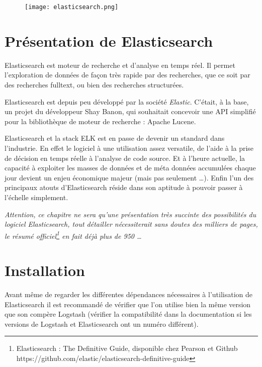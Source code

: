 
\begin{figure}[H]
\center
\texttt{[image: elasticsearch.png]}
\label{fig:elasticsearchlogo.png}
\end{figure}
\section{Présentation de Elasticsearch}
Elasticsearch est moteur de recherche et d'analyse en temps réel. Il permet l'exploration
de données de façon très rapide par des recherches, que ce soit par des recherches
\gls{fulltext}, ou bien des recherches structurées.

Elasticsearch est depuis peu développé par la société \emph{Elastic}. C'était, à 
la base, un projet du développeur Shay Banon, qui souhaitait concevoir une API simplifié
pour la bibliothèque de moteur de recherche : Apache Lucene.

Elasticsearch et la stack ELK est en passe de devenir un standard dans l'industrie.
En effet le logiciel à une utilisation assez versatile, de l'aide à la prise de 
décision en temps réelle à l'analyse de code source. Et à l'heure actuelle, la capacité 
à exploiter les masses de données et de méta données accumulées chaque jour devient 
un enjeu économique majeur (mais pas seulement \ldots). Enfin l'un des principaux 
atouts d'Elasticsearch réside dans son aptitude à pouvoir passer à l'échelle simplement.

\footnotesize{\emph{Attention, ce chapitre ne sera qu'une présentation très succinte des possibilités 
du logiciel Elasticsearch, tout détailler nécessiterait \emph{sans doutes} des milliers
de pages, le résumé officiel\footnote{Elasticsearch : The Definitive Guide, disponible 
chez Pearson et Github https://github.com/elastic/elasticsearch-definitive-guide}
en fait déjà \emph{plus de 950} \ldots}}

\section{Installation}
Avant même de regarder les différentes dépendances nécessaires à l'utilisation de
Elasticsearch il est recommandé de vérifier que l'on utilise bien la même version
que son compère Logstash (vérifier la compatibilité dans la documentation si les
versions de Logstash et Elasticsearch ont un numéro différent).

